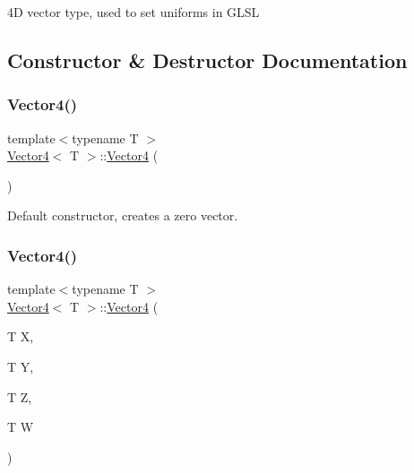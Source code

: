 4D vector type, used to set uniforms in G\+L\+SL 

\begin{DoxyVerb}\end{DoxyVerb}
 

\subsection{Constructor \& Destructor Documentation}
\mbox{\label{struct_vector4_afdef97d94e5697622b5322637028accf}} 
\subsubsection{\texorpdfstring{Vector4()}{Vector4()}\hspace{0.1cm}{\footnotesize\ttfamily [1/4]}}
{\footnotesize\ttfamily template$<$typename T $>$ \\
\mbox{\hyperlink{struct_vector4}{Vector4}}$<$ T $>$\+::\mbox{\hyperlink{struct_vector4}{Vector4}} (\begin{DoxyParamCaption}{ }\end{DoxyParamCaption})\hspace{0.3cm}{\ttfamily [inline]}}



Default constructor, creates a zero vector. 

\begin{DoxyVerb}\end{DoxyVerb}
 \mbox{\label{struct_vector4_ae099ed0a6d7d78ed38ac023d0e4cec25}} 
\subsubsection{\texorpdfstring{Vector4()}{Vector4()}\hspace{0.1cm}{\footnotesize\ttfamily [2/4]}}
{\footnotesize\ttfamily template$<$typename T $>$ \\
\mbox{\hyperlink{struct_vector4}{Vector4}}$<$ T $>$\+::\mbox{\hyperlink{struct_vector4}{Vector4}} (\begin{DoxyParamCaption}\item[{T}]{X,  }\item[{T}]{Y,  }\item[{T}]{Z,  }\item[{T}]{W }\end{DoxyParamCaption})\hspace{0.3cm}{\ttfamily [inline]}}



